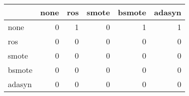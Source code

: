 \begin{tabular}{lrrrrr}
\hline
        &   none &   ros &   smote &   bsmote &   adasyn \\
\hline
 none   &      0 &     1 &       0 &        1 &        1 \\
 ros    &      0 &     0 &       0 &        0 &        0 \\
 smote  &      0 &     0 &       0 &        0 &        0 \\
 bsmote &      0 &     0 &       0 &        0 &        0 \\
 adasyn &      0 &     0 &       0 &        0 &        0 \\
\hline
\end{tabular}